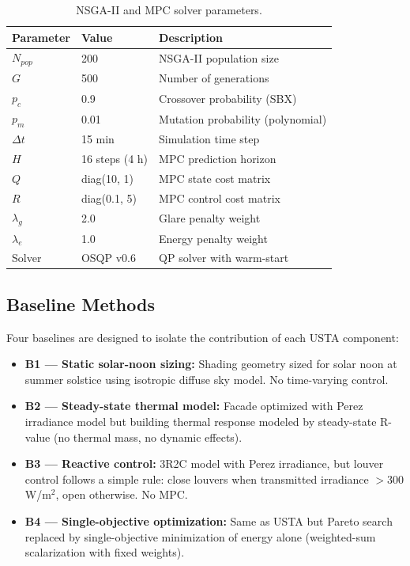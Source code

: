\documentclass[preprint,12pt]{elsarticle}
\begin{document}
\begin{table}[htbp]
\centering
\caption{NSGA-II and MPC solver parameters.}
\label{tab:solver}
\begin{tabularx}{\textwidth}{@{} l l >{\raggedright\arraybackslash}X @{}}
\toprule
\textbf{Parameter} & \textbf{Value} & \textbf{Description} \\
\midrule
$N_{pop}$ & 200 & NSGA-II population size \\
$G$ & 500 & Number of generations \\
$p_c$ & 0.9 & Crossover probability (SBX) \\
$p_m$ & 0.01 & Mutation probability (polynomial) \\
$\Delta t$ & 15 min & Simulation time step \\
$H$ & 16 steps (4 h) & MPC prediction horizon \\
$Q$ & diag(10, 1) & MPC state cost matrix \\
$R$ & diag(0.1, 5) & MPC control cost matrix \\
$\lambda_g$ & 2.0 & Glare penalty weight \\
$\lambda_e$ & 1.0 & Energy penalty weight \\
Solver & OSQP v0.6 & QP solver with warm-start \\
\bottomrule
\end{tabularx}
\end{table}

\subsection{Baseline Methods}

Four baselines are designed to isolate the contribution of each USTA component:

\begin{itemize}
\item \textbf{B1 --- Static solar-noon sizing:} Shading geometry sized for solar noon at summer solstice using isotropic diffuse sky model. No time-varying control.

\item \textbf{B2 --- Steady-state thermal model:} Facade optimized with Perez irradiance model but building thermal response modeled by steady-state R-value (no thermal mass, no dynamic effects).

\item \textbf{B3 --- Reactive control:} 3R2C model with Perez irradiance, but louver control follows a simple rule: close louvers when transmitted irradiance $> 300$ W/m$^2$, open otherwise. No MPC.

\item \textbf{B4 --- Single-objective optimization:} Same as USTA but Pareto search replaced by single-objective minimization of energy alone (weighted-sum scalarization with fixed weights).
\end{itemize}
\end{document}
